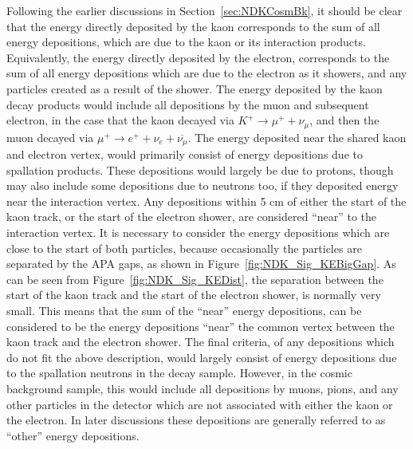 Following the earlier discussions in Section~\ref{sec:NDKCosmBk}, it should be clear that the energy directly deposited by the kaon corresponds to the sum of all energy depositions, which are due to the kaon or its interaction products. Equivalently, the energy directly deposited by the electron, corresponds to the sum of all energy depositions which are due to the electron as it showers, and any particles created as a result of the shower. The energy deposited by the kaon decay products would include all depositions by the muon and subsequent electron, in the case that the kaon decayed via $K^{+} \rightarrow \mu^{+} + \nu_{\mu}$, and then the muon decayed via $\mu^{+} \rightarrow e^{+} + \nu_{e} + \overline{\nu_{\mu}}$. The energy deposited near the shared kaon and electron vertex, would primarily consist of energy depositions due to spallation products. These depositions would largely be due to protons, though may also include some depositions due to neutrons too, if they deposited energy near the interaction vertex. Any depositions within 5 cm of either the start of the kaon track, or the start of the electron shower, are considered ``near'' to the interaction vertex. It is necessary to consider the energy depositions which are close to the start of both particles, because occasionally the particles are separated by the APA gaps, as shown in Figure~\ref{fig:NDK_Sig_KEBigGap}. As can be seen from Figure~\ref{fig:NDK_Sig_KEDist}, the separation between the start of the kaon track and the start of the electron shower, is normally very small. This means that the sum of the ``near'' energy depositions, can be considered to be the energy depositions ``near'' the common vertex between the kaon track and the electron shower. The final criteria, of any depositions which do not fit the above description, would largely consist of energy depositions due to the spallation neutrons in the decay sample. However, in the cosmic background sample, this would include all depositions by muons, pions, and any other particles in the detector which are not associated with either the kaon or the electron. In later discussions these depositions are generally referred to as ``other'' energy depositions. \\


